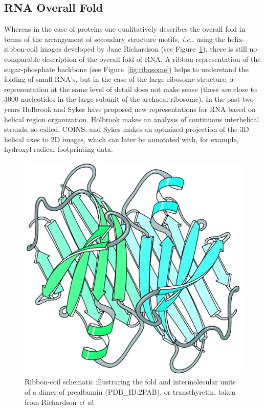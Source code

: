 \subsection{RNA  Overall Fold}
Whereas  in  the case  of  proteins  one  qualitatively describes  the
overall  fold  in terms  of  the  arrangement  of secondary  structure
motifs, \textit{i.e.}, using the helix-ribbon-coil images developed by
Jane           Richardson          \cite{richardson2000}          (see
Figure~\ref{fig:ribboncoil}), there is still no comparable description
of  the overall  fold of  RNA. A  ribbon representation  of  the
sugar-phosphate backbone (see Figure~\ref{fig:ribosome}) helps to understand
the  folding of  small  RNA's, but  in  the case  of  the large
ribosome structure,  a
representation at  the same  level of detail  does not make  sense
(these are  close to 3000  nucleotides in the
large  subunit of  the  archaeal  ribosome).  In  the  past two  years
Holbrook \cite{holbrook2008} and  Sykes \cite{sykes2009} have proposed
new  representations for  RNA  based on  helical region  organization.
Holbrook  makes an  analysis  of continuous  interhelical strands,  so
called,  COINS, and  Sykes  makes  an optmized  projection  of the  3D
helical  axes to 2D  images, which  can later  be annotated  with, for
example, hydroxyl radical footprinting data.

\begin{figure}[ht]
\centering
\includegraphics[scale=0.4]{Chapter1/overallfold.png}
\caption{Ribbon-coil    schematic    illustraring    the   fold    and
  intermolecular  units of  a dimer  of prealbumin  (PDB\_ID:2PAB), or
  transthyretin,    taken     from    Richardson    \textit{et    al.}
  \cite{richardson2002}}
\label{fig:ribboncoil}
\end{figure}

